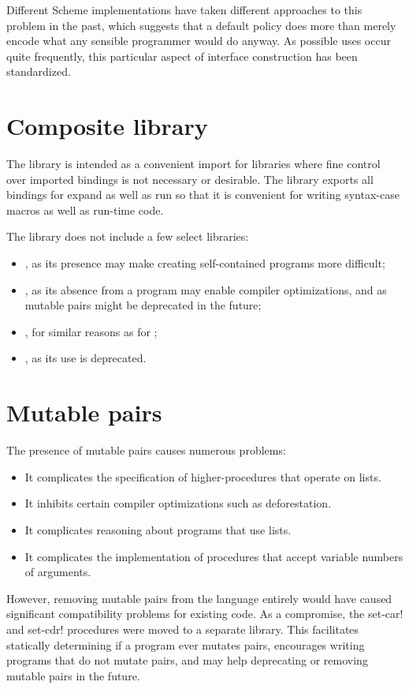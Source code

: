 \documentclass[twoside,twocolumn]{algol60}
\begin{document}
Different Scheme implementations have taken different approaches to
this problem in the past, which suggests that a default policy does
more than merely encode what any sensible programmer would do anyway.  As
possible uses occur quite frequently, this particular aspect of
interface construction has been standardized.


\chapter{Composite library}

The \thersixlibrary{} library is intended as a convenient import for
libraries where fine control over imported bindings is not necessary
or desirable. The \thersixlibrary{} library exports all bindings for
{\cf expand} as well as {\cf run} so that it is convenient for writing
{\cf syntax-case} macros as well as run-time code.

The \rsixlibrary{} library does not include a few select libraries:
%
\begin{itemize}
\item {}, as its presence may make creating
  self-contained programs more difficult;
\item {}, as its absence from a program may enable compiler
  optimizations, and as mutable pairs might be deprecated in the future;
\item {}, for similar reasons as for
  ;
\item {}, as its use is deprecated.
\end{itemize}


\chapter{Mutable pairs}

The presence of mutable pairs causes numerous problems:
%
\begin{itemize}
\item It complicates the specification of higher-procedures that
  operate on lists.
\item It inhibits certain compiler optimizations such as
  deforestation.
\item It complicates reasoning about programs that use lists.
\item It complicates the implementation of procedures that accept
  variable numbers of arguments.
\end{itemize}
%
However, removing mutable pairs from the language entirely would have
caused significant compatibility problems for existing code.  As a
compromise, the {\cf set-car!} and {\cf set-cdr!} procedures were
moved to a separate library.  This facilitates statically determining
if a program ever mutates pairs, encourages writing programs that do
not mutate pairs, and may help deprecating or removing mutable pairs
in the future.
\end{document}
